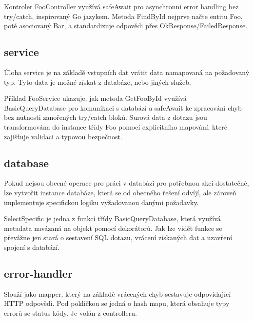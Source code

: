 Kontroler FooController využívá safeAwait pro asynchronní error handling bez try/catch, inspirovaný Go jazykem. Metoda FindById nejprve načte entitu Foo, poté asociovaný Bar, a standardizuje odpovědi přes OkResponse/FailedResponse.

\subsection{service}
Úloha service je na základě vstupních dat vrátit data namapovaná na požadovaný typ. Tyto data je možné získat z databáze, nebo jiných služeb.



Příklad FooService ukazuje, jak metoda GetFooById využívá BasicQueryDatabase pro komunikaci s databází a safeAwait ke zpracování chyb bez nutnosti zanořených try/catch bloků. Surová data z dotazu jsou transformována do instance třídy Foo pomocí explicitního mapování, které zajišťuje validaci a typovou bezpečnost.

\subsection{database}
Pokud nejsou obecné operace pro práci v databázi pro potřebnou akci dostatečné, lze vytvořit instance databáze, která se od obecného řešení odvíjí, ale zároveň implementuje specifickou logiku vyžadovanou danými požadavky.



SelectSpecific je jedna z funkcí třídy BasicQueryDatabase, která využívá metadata navázaná na objekt pomocí dekorátorů. Jak lze vidět funkce se převážne jen stará o sestavení SQL dotazu, vrácení získaných dat a uzavření spojení s databází.

\subsection{error-handler}
Slouží jako mapper, který na základě vrácených chyb sestavuje odpovídající HTTP odpovědi. Pod pokličkou se jedná o hash mapu, která obsahuje typy errorů se status kódy. Je volán z controlleru.
